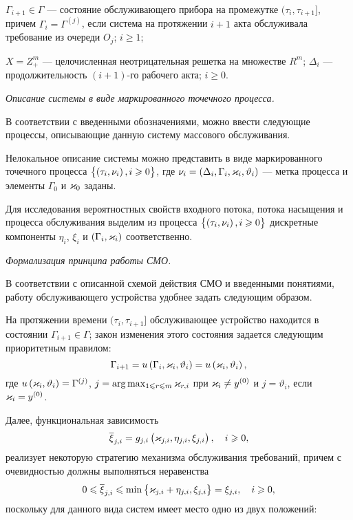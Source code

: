 \documentclass[a4paper,14pt,russian]{article}
\newcommand{\G}{\Gamma}
\newcommand{\Gr}[1]{\Gamma^{(#1)}}
\begin{document}
$\Gamma_{i+1} \in \Gamma $ --- состояние обслуживающего прибора на промежутке $(\tau_i,\tau_{i+1}]$, причем $\Gamma_i = \Gamma^{(j)}$, если система на протяжении $i+1$ акта обслуживала требование из очереди $O_j$; $i \geqslant 1$;

$X = Z_{+}^m$ --- целочисленная неотрицательная решетка на множестве $R^m$; $\Delta_i$ --- продолжительность $(i+1)$-го рабочего акта; $i \geqslant 0$.

\textit{Описание системы в виде маркированного точечного процесса.}

В соответствии с введенными обозначениями, можно ввести следующие процессы, описывающие данную систему массового обслуживания.

Нелокальное описание системы можно представить в виде маркированного точечного процесса $\left\{\left(\tau_i,\nu_i\right), i\geqslant 0\right\}$, где $\nu_i= \left(\Delta_i,\Gamma_i,\varkappa_i,\vartheta_i\right)$  --- метка процесса и элементы $\G_0$ и $\varkappa_0$ заданы.
	
Для исследования вероятностных свойств входного потока, потока насыщения и процесса обслуживания выделим из процесса $\left\{\left(\tau_i,\nu_i\right), i\geqslant 0\right\}$ дискретные компоненты $\eta_i$, $\xi_i$ и $\br{\G_i,\vk_i}$ соответственно.

\textit{Формализация принципа работы СМО.}

В соответствии с описанной схемой действия СМО и введенными понятиями, работу обслуживающего устройства удобнее задать следующим образом. 

На протяжении времени  $(\tau_i,\tau_{i+1}]$ обслуживающее устройство находится в состоянии $\G_{i+1} \in \G$; закон изменения этого состояния задается следующим приоритетным правилом:
\begin{equation}
\G_{i+1} = u\br{\G_i, \vk_i, \vartheta_i} = u\br{\vk_i, \vartheta_i},
\label{gamma_func}
\end{equation}
где $ u\br{\vk_i, \vartheta_i}= \Gr{j}$, $j = \mathrm{arg}\max_{1\leqslant r\leqslant m} \varkappa_{r,i} $ при $\varkappa_i \neq y^{(0)}$ и $j=\vartheta_i$, если $\varkappa_i = y^{(0)}$.

Далее, функциональная зависимость 
\begin{equation*}
\overline{\xi}_{j,i} = g_{j,i} \left(\varkappa_{j,i}, \eta_{j,i}, \xi_{j,i}\right), \quad  i \geqslant 0,
\end{equation*}
реализует некоторую стратегию механизма обслуживания требований, причем с очевидностью должны выполняться неравенства
\begin{equation*}
0 \leqslant \overline{\xi}_{j,i}  \leqslant \min\left\{\varkappa_{j,i} + \eta_{j,i},  \xi_{j,i}\right\} = \xi_{j,i}, \quad i \geqslant 0,
\end{equation*}
поскольку для данного вида систем имеет место одно из двух положений:
\end{document}
